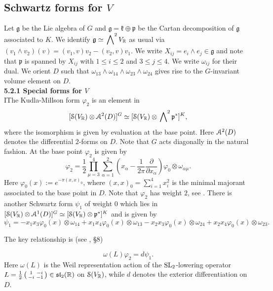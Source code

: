 \subsection{Schwartz forms for $V$}\label{V-forms}

Let $\mathfrak{g} $ be the Lie algebra of $G$ and $\mathfrak{g}= \mathfrak{k} \oplus \mathfrak{p}$ be the Cartan decomposition of $\mathfrak{g}$ associated to $K$.  We identify 
 $\mathfrak{g} \simeq \sideset{}{^{2}}\bigwedge V_{\mathbb{R}}$ as usual via $
(v_1 \wedge v_2)(v) = (v_1,v)v_2 - (v_2,v)v_1$. We write $X_{ij} = e_i \wedge e_j \in \mathfrak{g}$ and note that $\mathfrak{p}$ is spanned by $X_{ij}$ with $1 \leq i \leq 2$ and $3 \leq j \leq 4$. We write $\omega_{ij}$ for their dual. We orient $D$ such that $\omega_{13} \wedge \omega_{14} \wedge \omega_{23} \wedge \omega_{24}$ gives rise to the $G$-invariant volume element on $D$. 
\\[12pt] 
\textbf{5.2.1 Special forms for $V$} 
\\[10pt]
IThe Kudla-Millson form $\varphi_2$ is an element in 
\[
 [\mathcal{S}(V_{\mathbb{R}}) \otimes \mathcal{A}^2(D)]^G\simeq
[\mathcal{S}(V_{\mathbb{R}}) \otimes \sideset{}{^{2}}\bigwedge \mathfrak{p}^{\ast}]^K,
\]
where the isomorphism is given by evaluation at the base point.
Here $\mathcal{A}^2(D)$ denotes the differential $2$-forms on $D$. Note
that $G$ acts diagonally in the natural fashion. At the base point
$\varphi_2$ is given by
\[
\varphi_2= \frac12 \prod_{\mu=3}^4 \sum_{\alpha=1}^{2}  \left( x_{\alpha} - \frac1{2\pi}\frac{\partial}{\partial x_{\alpha}} \right) \varphi_0 \otimes \omega_{\alpha\mu}.
\]
Here $\varphi_0(x) := e^{-\pi(x,x)_{0}}$, where $(x,x)_0= \sum_{i=1}^4
x_i^2$ is the minimal majorant associated to the base point in $D$.
Note that $\varphi_2$ has weight $2$, see \cite{KM1}. There is
another Schwartz form $\psi_1$ of weight $0$ which lies in $
[\mathcal{S}(V_{\mathbb{R}}) \otimes \mathcal{A}^1(D)]^G\simeq
[\mathcal{S}(V_{\mathbb{R}}) \otimes \mathfrak{p}^{\ast}]^K$ and is given by
\begin{equation}\label{psi20}
\psi_1 =  -x_1x_3\varphi_0(x) \otimes \omega_{14}+x_1x_4  \varphi_0(x) \otimes \omega_{13} - x_2x_3 \varphi_0(x) \otimes \omega_{24}+x_2x_4\varphi_0(x) \otimes \omega_{23}. 
\end{equation}


The key relationship is (see \cite{KM90}, \S 8)

\begin{theorem}\label{localholomorphic1}
\[
\omega(L) \varphi_2 = d \psi_1.
\]
Here $\omega(L)$ is the Weil representation action
of the $\operatorname{SL}_2$-lowering operator $L = \tfrac12 \left(
\begin{smallmatrix}1 & -i \\ -i & -1\end{smallmatrix} \right)  \in \mathfrak{sl}_2(\mathbb{R})$ on
$\mathcal{S}(V_{\mathbb{R}})$, while $d$ denotes the exterior differentiation on $D$. 
\end{theorem}

